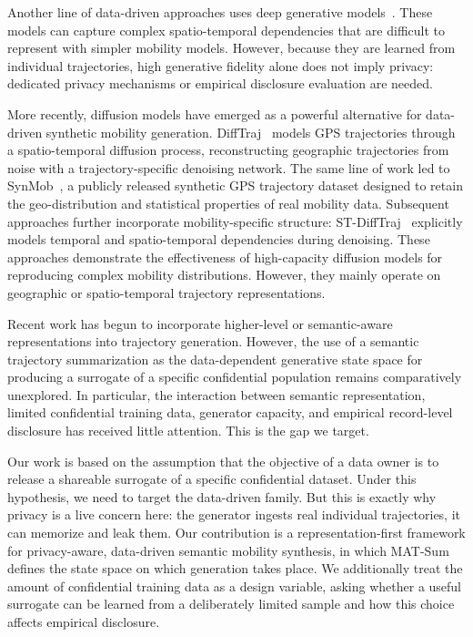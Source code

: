 \documentclass[sigconf,nonacm]{acmart}
\begin{document}
Another line of data-driven approaches uses deep generative
models~\cite{feng2020,rao2020,zhu2023}. These models can capture
complex spatio-temporal dependencies that are difficult to represent with simpler mobility models. However, because they are learned from individual trajectories, high generative fidelity alone does not imply privacy: dedicated privacy mechanisms or empirical disclosure
evaluation are needed.

More recently, diffusion models have emerged as a powerful alternative for data-driven synthetic mobility generation. DiffTraj~\cite{zhu2023difftraj}
models GPS trajectories through a spatio-temporal diffusion process, reconstructing geographic trajectories from noise with a trajectory-specific denoising network. The same line of work led to SynMob~\cite{zhu2023synmob}, a publicly released synthetic GPS trajectory dataset designed to retain
the geo-distribution and statistical properties of real mobility data.
Subsequent approaches further incorporate mobility-specific structure: ST-DiffTraj~\cite{wang2024stdifftraj} explicitly models temporal and spatio-temporal dependencies during denoising. 
These approaches demonstrate the effectiveness of
high-capacity diffusion models for reproducing complex mobility
distributions. However, they mainly operate on geographic or spatio-temporal trajectory representations. 

Recent work has begun to incorporate higher-level or semantic-aware representations into trajectory generation. However, the use of a semantic trajectory summarization as the data-dependent generative state space for producing a surrogate of a specific confidential population remains comparatively unexplored. In particular, the interaction between semantic representation, limited confidential training data, generator capacity, and empirical record-level disclosure has received little attention. This is the gap we target.

Our work is based on the assumption that the objective of a data owner is to release a shareable surrogate of a specific confidential dataset. Under this hypothesis, we need to target the data-driven family. 
But this is exactly why privacy is a live concern here: the generator ingests real individual trajectories, it can memorize and leak them. %
Our contribution is a representation-first framework for
privacy-aware, data-driven semantic mobility synthesis, in which
MAT-Sum defines the state space on which generation takes place.
We additionally treat the amount of confidential training data as a
design variable, asking whether a useful surrogate can be learned
from a deliberately limited sample and how this choice affects
empirical disclosure.
\end{document}
